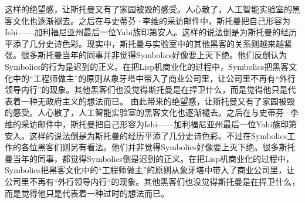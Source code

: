 \ifdefined\chs
\ifdefined\vone
这样的绝望感，让斯托曼又有了家园被毁的感受。人心散了，人工智能实验室的黑客文化也逐渐褪去。之后在与史蒂芬·李维的采访邮件中，斯托曼把自己形容为Ishi——加利福尼亚州最后一位Yahi族印第安人。这样的说法倒是为斯托曼的经历平添了几分史诗色彩。现实中，斯托曼与实验室中的其他黑客的关系则越来越紧张。很多斯托曼当年的同事并非觉得Symbolics好像要上灭下绝。他们反倒认为Symbolics的行为是迟到的正义。在把Lisp机商业化的过程中，Symbolics把黑客文化中的``工程师做主''的原则从象牙塔中带入了商业公司里，让公司里不再有``外行领导内行''的现象。其他黑客们也没觉得斯托曼是在捍卫什么，而是觉得他只是代表着一种无政府主义的想法而已。
\fi
\ifdefined\vtwo
由此带来的绝望感，让斯托曼又有了家园被毁的感受。人心散了，人工智能实验室的黑客文化也逐渐褪去。之后在与史蒂芬·李维的采访邮件中，斯托曼把自己形容为Ishi——加利福尼亚州最后一位Yahi族印第安人。这样的说法倒是为斯托曼的经历平添了几分史诗色彩。不过在Symbolics工作的各位黑客们则另有看法。他们并非觉得Symbolics好像要上灭下绝。很多斯托曼当年的同事，都觉得Symbolics倒是迟到的正义。在把Lisp机商业化的过程中，Symbolics把黑客文化中的``工程师做主''的原则从象牙塔中带入了商业公司里，让公司里不再有``外行领导内行``的现象。其他黑客们也没觉得斯托曼是在捍卫什么，而是觉得他只是代表着一种过时的想法而已。
\fi
\fi


